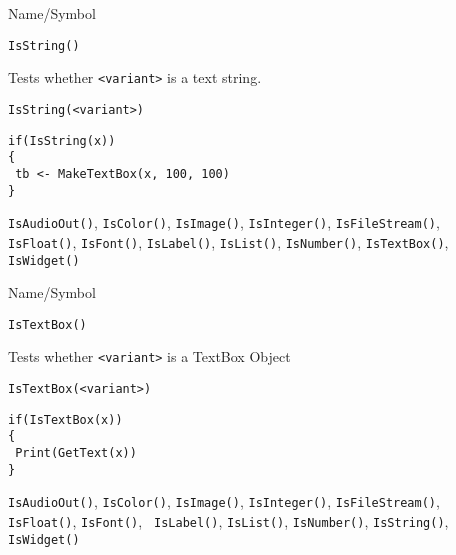\begin{desc}{Name/Symbol}
\item[Name/Symbol]	\verb+IsString()+

\item[Description]	Tests whether \verb+<variant>+ is a text string.

\item[Usage]		
\begin{verbatim}
IsString(<variant>)
\end{verbatim}

\item[Example]	
\begin{verbatim}
if(IsString(x))
{
 tb <- MakeTextBox(x, 100, 100)
}
\end{verbatim}

\item[See Also]	\verb+IsAudioOut()+, \verb+IsColor()+, \verb+IsImage()+, \verb+IsInteger()+, 
		\verb+IsFileStream()+, \verb+IsFloat()+, \verb+IsFont()+, \verb+IsLabel()+,
		\verb+IsList()+, \verb+IsNumber()+, \verb+IsTextBox()+, \verb+IsWidget()+
\end{desc}

\rl




\begin{desc}{Name/Symbol}
\item[Name/Symbol]	\verb+IsTextBox()+

\item[Description]	Tests whether \verb+<variant>+ is a TextBox Object

\item[Usage]
\begin{verbatim}
IsTextBox(<variant>)
\end{verbatim}

\item[Example]	
\begin{verbatim}
if(IsTextBox(x))
{
 Print(GetText(x))
}
\end{verbatim}

\item[See Also] \verb+IsAudioOut()+, \verb+IsColor()+,
  \verb+IsImage()+, \verb+IsInteger()+, \verb+IsFileStream()+,
  \verb+IsFloat()+, \verb+IsFont()+, \verb+ IsLabel()+,
  \verb+IsList()+, \verb+IsNumber()+, \verb+IsString()+,
  \verb+IsWidget()+
\end{desc}

\rl

